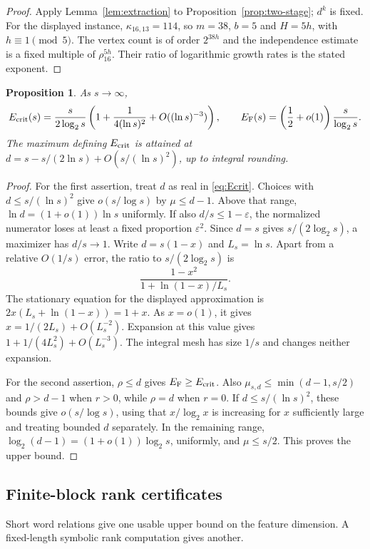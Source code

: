 \documentclass[11pt,a4paper]{article}
\newtheorem{proposition}[theorem]{Proposition}
\theoremstyle{definition}
\theoremstyle{remark}
\numberwithin{equation}{section}
\begin{document}
\begin{proof}
Apply Lemma~\ref{lem:extraction} to Proposition~\ref{prop:two-stage}; $d^k$ is fixed. For the displayed instance, $\kappa_{16,13}=114$, so $m=38$, $b=5$ and $H=5h$, with $h\equiv1\pmod5$. The vertex count is of order $2^{38h}$ and the independence estimate is a fixed multiple of $\rho_{16}^{5h}$. Their ratio of logarithmic growth rates is the stated exponent.
\end{proof}

\begin{proposition}\label{prop:asymptotic}
As $s\to\infty$,
\[
E_{\rm crit}(s)=\frac{s}{2\log_2s}\left(1+\frac{1}{4(\ln s)^2}+O((\ln s)^{-3})\right),
\qquad E_{\rm F}(s)=\left(\frac12+o(1)\right)\frac{s}{\log_2s}.
\]
The maximum defining $E_{\rm crit}$ is attained at
$d=s-s/(2\ln s)+O(s/(\ln s)^2)$, up to integral rounding.
\end{proposition}

\begin{proof}
For the first assertion, treat $d$ as real in \eqref{eq:Ecrit}. Choices with $d\le s/(\ln s)^2$ give $o(s/\log s)$ by $\mu\le d-1$. Above that range, $\ln d=(1+o(1))\ln s$ uniformly. If also $d/s\le1-\varepsilon$, the normalized numerator loses at least a fixed proportion $\varepsilon^2$. Since $d=s$ gives $s/(2\log_2s)$, a maximizer has $d/s\to1$. Write $d=s(1-x)$ and $L_s=\ln s$. Apart from a relative $O(1/s)$ error, the ratio to $s/(2\log_2s)$ is
\[
\frac{1-x^2}{1+\ln(1-x)/L_s}.
\]
The stationary equation for the displayed approximation is $2x(L_s+\ln(1-x))=1+x$. As $x=o(1)$, it gives $x=1/(2L_s)+O(L_s^{-2})$. Expansion at this value gives $1+1/(4L_s^2)+O(L_s^{-3})$. The integral mesh has size $1/s$ and changes neither expansion.

For the second assertion, $\rho\le d$ gives $E_{\rm F}\ge E_{\rm crit}$. Also $\mu_{s,d}\le\min(d-1,s/2)$ and $\rho>d-1$ when $r>0$, while $\rho=d$ when $r=0$. If $d\le s/(\ln s)^2$, these bounds give $o(s/\log s)$, using that $x/\log_2x$ is increasing for $x$ sufficiently large and treating bounded $d$ separately. In the remaining range, $\log_2(d-1)=(1+o(1))\log_2s$, uniformly, and $\mu\le s/2$. This proves the upper bound.
\end{proof}

\subsection{Finite-block rank certificates}\label{sec:finite-blocks}
Short word relations give one usable upper bound on the feature dimension. A fixed-length symbolic rank computation gives another.
\end{document}
